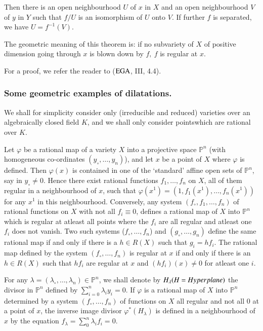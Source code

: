 Then there is an open neighbourhood $U$ of $x$ in $X$ and an open
neighbourhood $V$ of $y$ in $Y$ such that $f/U$ is an isomorphism of
$U$ onto $V$. If further $f$ is separated, we have $U = f^{-1}(V)$. 

The geometric meaning of this theorem is: if no subvariety of $X$ of
positive dimension going through $x$ is blown down by $f, ~ f$ is
regular at $x$.  

For a proof, we refer the reader to ($\operatorname{EGA}$, III, 4.4).


\subsubsection*{Some geometric examples of dilatations.}

We shall for simplicity consider only (irreducible and reduced)
varieties over an algebraically closed field $K$, and we shall only
consider points\pageoriginale which are rational over $K$. 

Let $\varphi$ be a rational map of a variety $X$ into a projective
space $\mathbb{P}^n$ (with homogeneous co-ordinates $(y_\circ, \ldots ,
y_n)$), and let $x$ be a point of $X$ where $\varphi$ is defined. Then
$\varphi(x)$ is contained in one of the `standard' affine open sets of
$\mathbb{P}^n$, say in $y_\circ \neq 0$. Hence there exist rational
functions $f_1,\ldots, f_n$ on $X$, all of them regular in a
neighbourhood of $x$, such that $\varphi(x^1) = (1, f_1(x^1), \ldots ,
f_n(x^1))$ for any $x^1$ in this neighbourhood. Conversely, any system
$(f_\circ, f_1, \ldots , f_n)$ of rational functions on $X$ with not all
$f_i \equiv 0$, defines a rational map of $X$ into $\mathbb{P}^n$ which
is regular at atleast all points where the $f_i$ are all regular and
atleast one $f_i$ does not vanish. Two such systems ($f_\circ, \ldots
,f_n$) and $(g_\circ, \ldots , g_n)$ define the same rational map if and
only if there is a $h \in R(X)$ such that $g_i = h f_i$. The rational
map defined by the system $(f_\circ, \ldots , f_n)$ is regular at $x$ if
and only if there is an $h \in R(X)$ such that $hf_i$ are regular at
$x$ and $(h f_i)(x) \neq 0$ for atleast one $i$. 

For any $\lambda = (\lambda_\circ,\ldots , \lambda_n) \in \mathbb{P}^n$, we
shall denote by $H_ \lambda (H = Hyper\-plane)$ the divisor in
$\mathbb{P}^n$ defined by $\sum \limits^n_{i=0} \lambda_i y_i = 0$. If
$\varphi$ is a rational map of $X$ into $\mathbb{P}^n$ determined by a
system $(f_\circ, \ldots , f_n)$ of functions on $X$ all regular and not
all $0$ at a point of $x$, the inverse image divisor $\varphi^*(H_
\lambda)$ is defined in a neighbourhood of $x$ by the equation $f_
\lambda = \sum \limits^n_0 \lambda_i f_i = 0$. 

